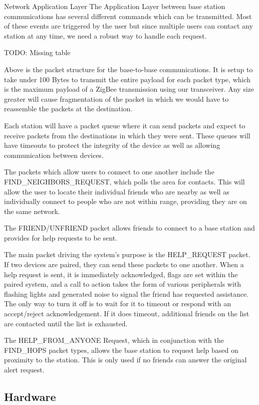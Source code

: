 \documentclass[journal]{IEEEtran}
\begin{document}
Network Application Layer
The Application Layer between base station communications has several different commands which can be transmitted.  Most of these events are triggered by the user but since multiple users can contact any station at any time, we need a robust way to handle each request.

TODO: Missing table

Above is the packet structure for the base-to-base communications.  It is setup to take under 100 Bytes to transmit the entire payload for each packet type, which is the maximum payload of a ZigBee transmission using our transceiver.  Any size greater will cause fragmentation of the packet in which we would have to reassemble the packets at the destination.

Each station will have a packet queue where it can send packets and expect to receive packets from the destinations in which they were sent.  These queues will have timeouts to protect the integrity of the device as well as allowing communication between devices.

The packets which allow users to connect to one another include the FIND\_NEIGHBORS\_REQUEST, which polls the area for contacts.  This will allow the user to locate their individual friends who are nearby as well as individually connect to people who are not within range, providing they are on the same network.

The FRIEND/UNFRIEND packet allows friends to connect to a base station and provides for help requests to be sent.

The main packet driving the system's purpose is the HELP\_REQUEST packet.  If two devices are paired, they can send these packets to one another.  When a help request is sent, it is immediately acknowledged, flags are set within the paired system, and a call to action takes the form of various peripherals with flashing lights and generated noise to signal the friend has requested assistance.  The only way to turn it off is to wait for it to timeout or respond with an accept/reject acknowledgement.  If it does timeout, additional friends on the list are contacted until the list is exhausted.

The HELP\_FROM\_ANYONE Request, which in conjunction with the FIND\_HOPS packet types, allows the base station to request help based on proximity to the station.  This is only used if no friends can answer the original alert request.

\subsection{Hardware}
\end{document}
